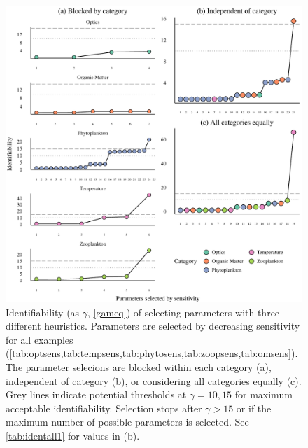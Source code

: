 \documentclass[letterpaper,12pt,oneside]{article}\usepackage[]{graphicx}\usepackage[]{color}
\begin{document}
\begin{figure}[!ht]

{\centering \includegraphics[width=\textwidth]{figs/heurist-1} 

}

\caption{Identifiability (as $\gamma$, \cref{gameq}) of selecting parameters with three different heuristics. Parameters are selected by decreasing sensitivity for all examples (\cref{tab:optsens,tab:tempsens,tab:phytosens,tab:zoopsens,tab:omsens}). The parameter selecions are blocked within each category (a), independent of category (b), or considering all categories equally (c). Grey lines indicate potential thresholds at $\gamma = 10, 15$ for maximum acceptable identifiability. Selection stops after $\gamma > 15$ or if the maximum number of possible parameters is selected. See \cref{tab:identall1} for values in (b).}\label{fig:heurist}
\end{figure}
\end{document}
